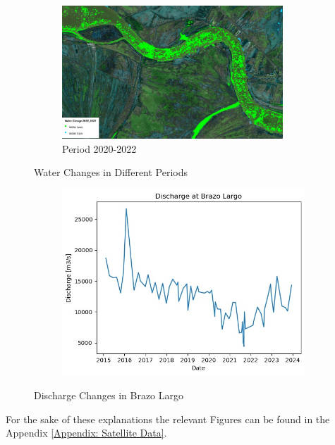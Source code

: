 \begin{figure}[H]
    \centering
    \begin{subfigure}[c]{0.6\textwidth}
        \includegraphics[width=\linewidth, height=5cm]{figures/ch5/2020-2022.jpg}
        \caption{Period 2020-2022}
        \label{fig:Period 2020-2022}
    \end{subfigure}
    
    \caption{Water Changes in Different Periods}
    \label{fig:Water Changes}
\end{figure}

\begin{figure}[H]
    \centering
    \begin{subfigure}{0.48\textwidth}
        \includegraphics[width=\linewidth]{figures/ch5/dischargepeak.jpg}
    \end{subfigure}
    
    \caption{Discharge Changes in Brazo Largo}
    \label{fig:Discharge Changes in Brazo Largo}
\end{figure}


For the sake of these explanations the relevant Figures can be found in the Appendix \ref{Appendix: Satellite Data}.

